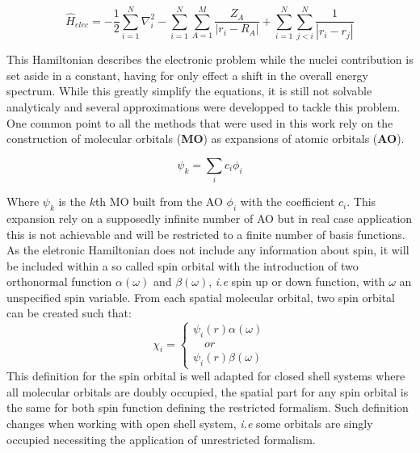 \documentclass[12pt]{article}
\numberwithin{equation}{section}
\begin{document}
\begin{equation}\label{Helec}
    \hat{H}_{elec}=-\frac{1}{2}\sum_{i=1}^{N}\nabla_i^2%
    -\sum_{i=1}^{N}\sum_{A=1}^{M}\frac{Z_A}{|r_i-R_A|}+\sum_{i=1}^{N}\sum_{j<i}^{N}\frac{1}{|r_i-r_j|}%
\end{equation}

This Hamiltonian describes the electronic problem while the nuclei contribution is set aside in a constant, having for only effect a shift in the overall energy spectrum. 
While this greatly simplify the equations, it is still not solvable analyticaly and several approximations were developped to tackle this problem. %
One common point to all the methods that were used in this work rely on the construction of molecular orbitals (\textbf{MO}) as expansions of atomic orbitals (\textbf{AO}).

\begin{equation}
    \psi_k=\sum_{i}c_i \phi_i
\end{equation}

Where $\psi_k$ is the $k$th MO built from the AO $\phi_i$ with the coefficient $c_i$. 
This expansion rely on a supposedly infinite number of AO but in real case application this is not achievable and will be restricted to a finite number of basis functions.
As the eletronic Hamiltonian does not include any information about spin, it will be included within a so called spin orbital with the introduction of two orthonormal function $\alpha(\omega)$ and $\beta(\omega)$, \textit{i.e} spin up or down function, with $\omega$ an unspecified spin variable.
From each spatial molecular orbital, two spin orbital can be created such that:
\begin{equation}
    \chi_i=\begin{cases}
    \psi_i(r)\alpha(\omega)\\
    \quad or \\
    \psi_i(r)\beta(\omega)
    \end{cases}
\end{equation}
This definition for the spin orbital is well adapted for closed shell systems where all molecular orbitals are doubly occupied, the spatial part for any spin orbital is the same for both spin function defining the restricted formalism.
Such definition changes when working with open shell system, \textit{i.e} some orbitals are singly occupied  necessiting the application of unrestricted formalism.
\end{document}

